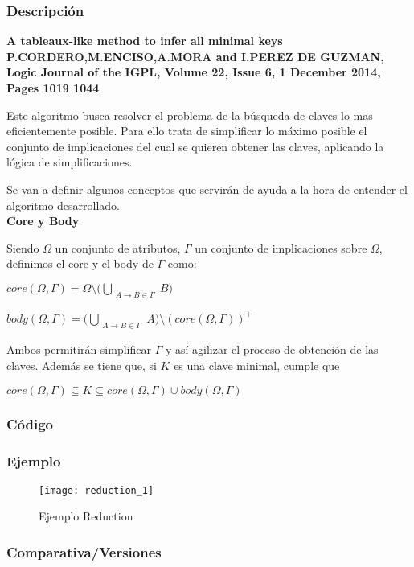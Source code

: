\subsubsection{Descripci\'on} 
\textbf{A tableaux-like method to infer all minimal keys
P.CORDERO,M.ENCISO,A.MORA and I.PEREZ DE GUZMAN,
Logic Journal of the IGPL, Volume 22, Issue 6, 1 December 2014, Pages 1019 1044}

Este algoritmo busca resolver el problema de la b\'usqueda de claves lo mas eficientemente posible. Para ello trata de simplificar lo m\'aximo posible el conjunto de implicaciones del cual se quieren obtener las claves, aplicando la l\'ogica de simplificaciones.

Se van a definir algunos conceptos que servir\'an de ayuda a la hora de entender el algoritmo desarrollado.\\

\textbf{Core y Body}

Siendo \(\Omega\) un conjunto de atributos, \(\Gamma\) un conjunto de implicaciones sobre \(\Omega\), definimos el core y el body de \(\Gamma\) como:
\begin{center}
    \(core(\Omega,\Gamma) = \Omega \setminus \big(\bigcup_{\substack{A \to B \in \Gamma}} B\big)\)

    \(body(\Omega,\Gamma) = \big(\bigcup_{\substack{A \to B \in \Gamma}} A\big) \setminus (core(\Omega,\Gamma))^+\)
\end{center}
Ambos permitir\'an simplificar \(\Gamma\) y as\'i agilizar el proceso de obtenci\'on de las claves. Adem\'as se tiene que, si \(K\) es una clave minimal, cumple que 
\begin{center}
    \(core(\Omega,\Gamma) \subseteq K \subseteq core(\Omega,\Gamma) \cup body(\Omega,\Gamma)\)
\end{center}
\newpage
\subsubsection{C\'odigo} 

\newpage
\subsubsection{Ejemplo} 
\begin{figure}[H]
    \centering
    \texttt{[image: reduction\_1]}
    \caption{Ejemplo Reduction}
    \label{fig:reduction_1}
\end{figure}
\subsubsection{Comparativa/Versiones} 